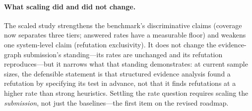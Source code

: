 \paragraph{What scaling did and did not change.} The scaled study
strengthens the benchmark's discriminative claims (coverage now
separates three tiers; answered rates have a measurable floor) and
weakens one system-level claim (refutation exclusivity). It does not
change the evidence-graph submission's standing---its rates are
unchanged and its refutation reproduces---but it narrows what that
standing demonstrates: at current sample sizes, the defensible
statement is that structured evidence analysis found a refutation by
specifying its test in advance, not that it finds refutations at a
higher rate than strong heuristics. Settling the rate question requires
scaling the \emph{submission}, not just the baselines---the first item
on the revised roadmap.
